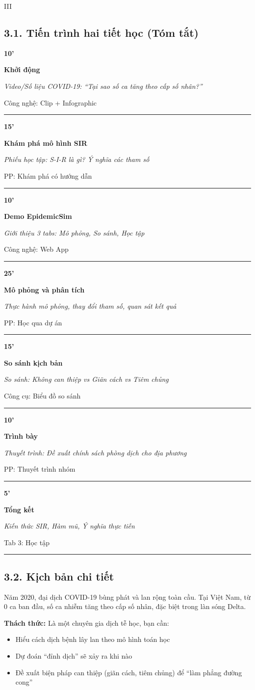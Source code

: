 \documentclass[12pt,a4paper]{article}
\newcommand{\teachingplan}[4]{
\noindent\begin{minipage}{0.12\textwidth}\centering\bfseries\sffamily\color{primary}#1\end{minipage}%
\begin{minipage}{0.23\textwidth}\sffamily\textbf{#2}\end{minipage}%
\begin{minipage}{0.35\textwidth}\textit{#3}\end{minipage}%
\begin{minipage}{0.25\textwidth}\small #4\end{minipage}
\vspace{1ex}\par\noindent\color{primary!30}\rule{\textwidth}{0.4pt}\vspace{1ex}}
\begin{document}
\begin{competitionsection}{III}
\vspace{0.5cm}
\subsection*{3.1. Tiến trình hai tiết học (Tóm tắt)}
\teachingplan{10'}{Khởi động}{Video/Số liệu COVID-19: ``Tại sao số ca tăng theo cấp số nhân?''}{Công nghệ: Clip + Infographic}
\teachingplan{15'}{Khám phá mô hình SIR}{Phiếu học tập: S-I-R là gì? Ý nghĩa các tham số}{PP: Khám phá có hướng dẫn}
\teachingplan{10'}{Demo EpidemicSim}{Giới thiệu 3 tabs: Mô phỏng, So sánh, Học tập}{Công nghệ: Web App}
\teachingplan{25'}{Mô phỏng và phân tích}{Thực hành mô phỏng, thay đổi tham số, quan sát kết quả}{PP: Học qua dự án}
\teachingplan{15'}{So sánh kịch bản}{So sánh: Không can thiệp vs Giãn cách vs Tiêm chủng}{Công cụ: Biểu đồ so sánh}
\teachingplan{10'}{Trình bày}{Thuyết trình: Đề xuất chính sách phòng dịch cho địa phương}{PP: Thuyết trình nhóm}
\teachingplan{5'}{Tổng kết}{Kiến thức SIR, Hàm mũ, Ý nghĩa thực tiễn}{Tab 3: Học tập}

\subsection*{3.2. Kịch bản chi tiết}

\begin{casestudy}
Năm 2020, đại dịch COVID-19 bùng phát và lan rộng toàn cầu. Tại Việt Nam, từ 0 ca ban đầu, số ca nhiễm tăng theo cấp số nhân, đặc biệt trong làn sóng Delta.

\textbf{Thách thức:} Là một chuyên gia dịch tễ học, bạn cần:
\begin{itemize}[leftmargin=*,noitemsep]
\item Hiểu cách dịch bệnh lây lan theo mô hình toán học
\item Dự đoán ``đỉnh dịch'' sẽ xảy ra khi nào
\item Đề xuất biện pháp can thiệp (giãn cách, tiêm chủng) để ``làm phẳng đường cong''
\end{itemize}
\end{casestudy}


\end{competitionsection}
\end{document}
